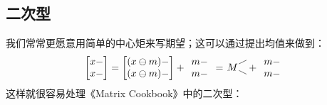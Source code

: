 \subsection{二次型}
我们常常更愿意用简单的中心矩来写期望；这可以通过提出均值来做到：
\renewcommand*{\arraystretch}{1}
\[
   \begin{bmatrix}
      x - \\
      x -
   \end{bmatrix}
   =
   \begin{bmatrix}
      (x\ominus m) - \\
      (x\ominus m) -
   \end{bmatrix}
   +
   \begin{array}{c}
      m - \\
      m -
   \end{array}
   =
   \begin{tikzpicture}[baseline=(T.base), inner sep=1pt]
      \node (T) {$M$};
      \draw (T) -- ++(.5,.25);
      \draw (T) -- ++(.5,-.25);
   \end{tikzpicture}
   +
   \begin{array}{c}
      m - \\
      m -
   \end{array}
\]
这样就很容易处理《Matrix Cookbook》中的二次型：
